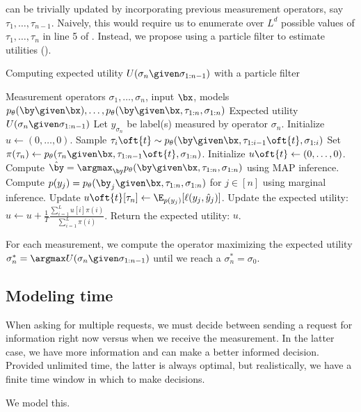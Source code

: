  can be trivially updated by incorporating previous measurement operators, say $\tau_1, \dots, \tau_{n-1}$.
Naively, this would require us to enumerate over $L^d$ possible values of $\tau_1, \dots, \tau_n$ in line 5 of .
Instead, we propose using a particle filter to estimate utilities ().

\begin{algorithm}
\renewcommand{\algorithmicrequire}{\textbf{Input:}}
\renewcommand{\algorithmicensure}{\textbf{Output:}}
\caption{Computing expected utility $U(\sigma_n \given \sigma_{1:n-1})$ with a particle filter}
  \label{algo:expected-utility}
  \begin{algorithmic}[1]
    \REQUIRE Measurement operators $\sigma_1, \dots, \sigma_n$, input $\bx$, models $p_\theta(\by \given \bx), \dots, p_\theta(\by \given \bx, \tau_{1:n}, \sigma_{1:n})$
    \ENSURE Expected utility $U(\sigma_n \given \sigma_{1:n-1})$
    \STATE Let $y_{\sigma_n}$ be label(s) measured by operator $\sigma_n$.
    \STATE Initialize $u \gets (0, \dots, 0)$.
      \STATE Sample $\tau_i\oft{t} \sim \p(\by \given \bx, \tau_{1:i-1}\oft{t}, \sigma_{1:i})$
      \ENDFOR
      \STATE Set $\pi(\tau_n) \gets \p(\tau_n \given \bx, \tau_{1:n-1}\oft{t}, \sigma_{1:n})$.
      \STATE Initialize $u\oft{t} \gets (0, \dots, 0)$.
      \STATE Compute $\byt = \argmax_{\by} p_\theta(\by \given \bx, \tau_{1:n}, \sigma_{1:n})$ using MAP inference.
      \STATE Compute $p(y_j) = p_\theta(\by_j \given \bx, \tau_{1:n}, \sigma_{1:n})$ for $j \in [n]$ using marginal inference.
      \STATE Update $u\oft{t}[\tau_n] \gets \E_{p(y_j)}[\ell(y_j, \yt_j)]$.
      \ENDFOR
      \STATE Update the expected utility: $u \gets u + \frac{1}{T} \frac{\sum_{i=1}^L u[i] \pi(i)}{\sum_{i=1}^L \pi(i)}$.
    \ENDFOR
    \STATE Return the expected utility: $u$.
  \end{algorithmic}
\end{algorithm}

For each measurement, we compute the operator maximizing the expected utility $\sigma_n^* = \argmax U(\sigma_n \given \sigma_{1:n-1})$ until we reach a $\sigma_n^* = \sigma_0$.

\subsection{Modeling time}
\label{sec:time}

When asking for multiple requests, we must decide between sending a request for information right now versus when we receive the measurement.
In the latter case, we have more information and can make a better informed decision.
Provided unlimited time, the latter is always optimal, but realistically, we have a finite time window in which to make decisions.

We model this.

